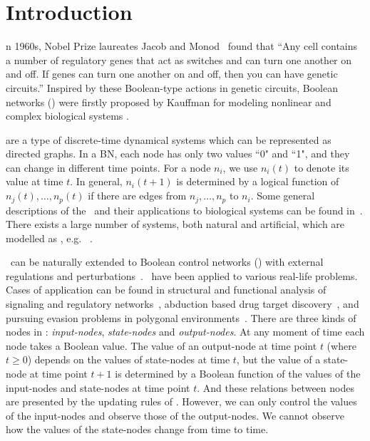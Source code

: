 

\section{Introduction}
\label{sec:intro}


n 1960s, Nobel Prize laureates Jacob and Monod~\cite{Jacob1961Genetic} found that ``Any cell contains a number of regulatory genes that act as switches and can turn one another on and off. If genes can turn one another on and off, then you can have genetic circuits.'' Inspired by these Boolean-type actions in genetic circuits, Boolean networks (\BNs) were firstly proposed by Kauffman for modeling nonlinear and complex biological systems \cite{Kauffman1968Metabolic}. 

{\BNs} are a type of discrete-time dynamical systems which can be represented as directed graphs. In a BN, each node has only two values ``0" and ``1", and they can change in different time points.  For a node $n_i$, we use $n_i(t)$ to denote its value at time $t$.
In general, $n_i(t+1)$ is determined by a logical function of $n_j(t),\ldots,n_p(t)$ if  there are  edges from $n_j,\ldots,n_p$ to $n_i$.  
Some general descriptions of the \BNs\ and their applications to biological systems can be found in~\cite{Kauffman1968Metabolic}. There exists a large number of  systems, both natural and artificial, which are modelled as \BNs, e.g. ~\cite{Akutsu2000Inferring, Shmulevich2002From, Faur2006Dynamical,Green2007The,Lou2010Multi}.

\BNs\ can be naturally extended to Boolean control networks (\BCNs) with external regulations and perturbations~\cite{Ideker2001A}. \BCNs\ have been applied to  various real-life problems. Cases of application can be found in 
structural and functional analysis of signaling and regulatory networks~\cite{Kaufman1999A, Klamt2006A}, 
abduction based drug target discovery~\cite{Biane2017Abduction}, 
and pursuing evasion problems in polygonal environments~\cite{Thunberg2011A}.
%
There are three kinds of nodes in \BCNs:  {\em input-nodes}, {\em state-nodes}  and {\em output-nodes}. At any moment of time each node takes a Boolean value.  The value of an output-node at time point $t$ (where $t\geq 0$)  depends on the values of state-nodes at time $t$, but the value of a  state-node at time point $t+1$  is determined by a  Boolean function of the values of the input-nodes and state-nodes at time point $t$. And these relations between nodes are presented by the updating rules of \BCN.  However,  we can only control the  values of the input-nodes and observe those of the output-nodes. We cannot observe how the values of the state-nodes change from time to time.

